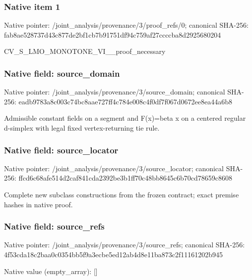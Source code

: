 \documentclass[10pt,a4paper]{article}
\begin{document}
\subsubsection{Native item 1}
Native pointer: /joint\_\allowbreak{}analysis/provenance/3/proof\_\allowbreak{}refs/0; canonical SHA-256: fab8ae528737d43c877de2bf1cb7b91751df94c759af27ccccba8d2925680204

\begingroup\raggedright\sloppy CV\_\allowbreak{}S\_\allowbreak{}LMO\_\allowbreak{}MONOTONE\_\allowbreak{}VI\_\allowbreak{}\_\allowbreak{}proof\_\allowbreak{}necessary\par\endgroup

\subsubsection{Native field: source\_\allowbreak{}domain}
Native pointer: /joint\_\allowbreak{}analysis/provenance/3/source\_\allowbreak{}domain; canonical SHA-256: eadb9783a8c003c74bc8aae727ff4c784e008c4f0df7f067d0672ee8ea44a6b8

\begingroup\raggedright\sloppy Admissible constant fields on a segment and F(x)=\allowbreak{}beta x on a centered regular d-simplex with legal fixed vertex-returning tie rule.\par\endgroup

\subsubsection{Native field: source\_\allowbreak{}locator}
Native pointer: /joint\_\allowbreak{}analysis/provenance/3/source\_\allowbreak{}locator; canonical SHA-256: ffcd6c68afe514d2caf841cda2392be3b1ff70c48bb8645c6b70cd78659c8608

\begingroup\raggedright\sloppy Complete new subclass constructions from the frozen contract;\allowbreak{} exact premise hashes in native proof.\par\endgroup

\subsubsection{Native field: source\_\allowbreak{}refs}
Native pointer: /joint\_\allowbreak{}analysis/provenance/3/source\_\allowbreak{}refs; canonical SHA-256: 4f53cda18c2baa0c0354bb5f9a3ecbe5ed12ab4d8e11ba873c2f11161202b945

Native value (empty\_\allowbreak{}array): []
\end{document}
